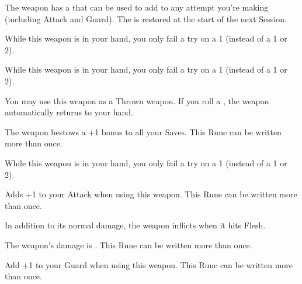 \begin{multicols*}{2}






The weapon has a  that can be used to add to any \RO attempt you're making (including Attack and Guard).  The \UD is restored at the start of the next Session.


While this weapon is in your hand, you only fail a \INJURY try on a 1 (instead of a 1 or 2).


While this weapon is in your hand, you only fail a \DEATH try on a 1 (instead of a 1 or 2).


You may use this weapon as a Thrown weapon. If you roll a , the weapon automatically returns to your hand.


The weapon bestows a +1 bonus to all your Saves.  This Rune can be written more than once.

\cbreak


While this weapon is in your hand, you only fail a \INSANITY try on a 1 (instead of a 1 or 2).





Adds +1 to your Attack \RO when using this weapon.  This Rune can be written more than once.


In addition to its normal damage, the weapon inflicts  when it hits Flesh.


The weapon's damage is \DCUP.  This Rune can be written more than once.


Add +1 to your Guard \RO when using this weapon.  This Rune can be written more than once.



\end{multicols*}
